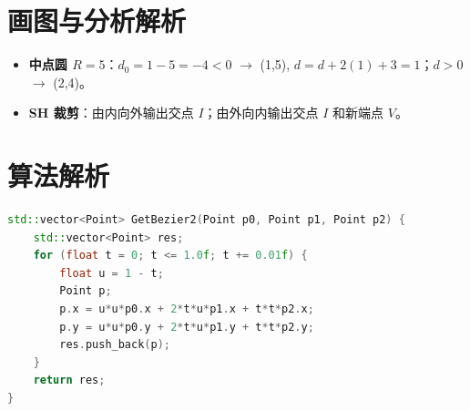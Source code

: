 \documentclass[UTF8]{ctexart}
\begin{document}
\section{画图与分析解析}
\begin{itemize}
    \item \textbf{中点圆 $R=5$}：$d_0 = 1-5=-4 < 0$ $\to$ (1,5), $d=d+2(1)+3=1$；$d > 0$ $\to$ (2,4)。
    \item \textbf{SH 裁剪}：由内向外输出交点 $I$；由外向内输出交点 $I$ 和新端点 $V$。
\end{itemize}

\section{算法解析}
\begin{lstlisting}[language=C++]
std::vector<Point> GetBezier2(Point p0, Point p1, Point p2) {
    std::vector<Point> res;
    for (float t = 0; t <= 1.0f; t += 0.01f) {
        float u = 1 - t;
        Point p;
        p.x = u*u*p0.x + 2*t*u*p1.x + t*t*p2.x;
        p.y = u*u*p0.y + 2*t*u*p1.y + t*t*p2.y;
        res.push_back(p);
    }
    return res;
}
\end{lstlisting}
\end{document}

